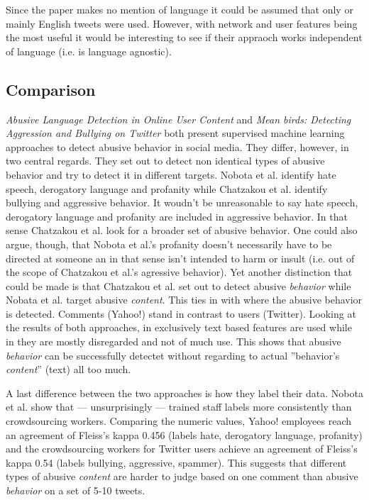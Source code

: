 \documentclass{proseminar}
\begin{document}
Since the paper makes no mention of language it could be assumed that only or mainly English tweets were used. However, with network and user features being the most useful it would be interesting to see if their appraoch works independent of language (i.e. is language agnostic).

\subsection{Comparison}
\emph{Abusive Language Detection in Online User Content} and \emph{Mean birds: Detecting Aggression and Bullying on Twitter} both present supervised machine learning approaches to detect abusive behavior in social media. They differ, however, in two central regards. They set out to detect non identical types of abusive behavior and try to detect it in different targets. Nobota et al. identify hate speech, derogatory language and profanity while Chatzakou et al. identify bullying and aggressive behavior. It woudn't be unreasonable to say hate speech, derogatory language and profanity are included in aggressive behavior. In that sense Chatzakou et al. look for a broader set of abusive behavior. One could also argue, though, that Nobota et al.'s profanity doesn't necessarily have to be directed at someone an in that sense isn't intended to harm or insult (i.e. out of the scope of Chatzakou et al.'s agressive behavior). Yet another distinction that could be made is that Chatzakou et al. set out to detect abusive \emph{behavior} while Nobata et al. target abusive \emph{content}. This ties in with where the abusive behavior is detected. Comments (Yahoo!) stand in contrast to users (Twitter). Looking at the results of both approaches, in \cite{Yahoo:2016} exclusively text based features are used while in \cite{Twitter:2017} they are mostly disregarded and not of much use. This shows that abusive \emph{behavior} can be successfully detectet without regarding to actual ''behavior's \emph{content}'' (text) all too much.

A last difference between the two approaches is how they label their data. Nobota et al. show that --- unsurprisingly --- trained staff labels more consistently than crowdsourcing workers. Comparing the numeric values, Yahoo! employees reach an agreement of Fleiss's kappa 0.456 (labels hate, derogatory language, profanity) and the crowdsourcing workers for Twitter users achieve an agreement of Fleiss's kappa 0.54 (labels bullying, aggressive, spammer). This suggests that different types of abusive \emph{content} are harder to judge based on one comment than abusive \emph{behavior} on a set of 5-10 tweets.
\end{document}

